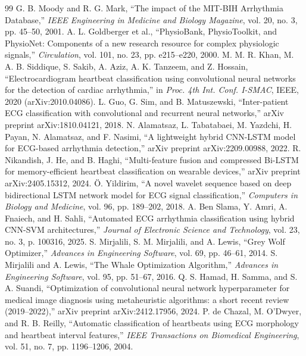 \documentclass[11pt,a4paper]{article}
\begin{document}
\begin{thebibliography}{99}
 G. B. Moody and R. G. Mark, ``The impact of the MIT-BIH Arrhythmia Database,'' \textit{IEEE Engineering in Medicine and Biology Magazine}, vol. 20, no. 3, pp. 45--50, 2001.
 A. L. Goldberger et al., ``PhysioBank, PhysioToolkit, and PhysioNet: Components of a new research resource for complex physiologic signals,'' \textit{Circulation}, vol. 101, no. 23, pp. e215--e220, 2000.
 M. M. R. Khan, M. A. B. Siddique, S. Sakib, A. Aziz, A. K. Tanzeem, and Z. Hossain, ``Electrocardiogram heartbeat classification using convolutional neural networks for the detection of cardiac arrhythmia,'' in \textit{Proc. 4th Int. Conf. I-SMAC}, IEEE, 2020 (arXiv:2010.04086).
 L. Guo, G. Sim, and B. Matuszewski, ``Inter-patient ECG classification with convolutional and recurrent neural networks,'' arXiv preprint arXiv:1810.04121, 2018.
 N. Alamatsaz, L. Tabatabaei, M. Yazdchi, H. Payan, N. Alamatsaz, and F. Nasimi, ``A lightweight hybrid CNN-LSTM model for ECG-based arrhythmia detection,'' arXiv preprint arXiv:2209.00988, 2022.
 R. Nikandish, J. He, and B. Haghi, ``Multi-feature fusion and compressed Bi-LSTM for memory-efficient heartbeat classification on wearable devices,'' arXiv preprint arXiv:2405.15312, 2024.
 \"{O}. Yildirim, ``A novel wavelet sequence based on deep bidirectional LSTM network model for ECG signal classification,'' \textit{Computers in Biology and Medicine}, vol. 96, pp. 189--202, 2018.
 A. Ben Slama, Y. Amri, A. Fnaiech, and H. Sahli, ``Automated ECG arrhythmia classification using hybrid CNN-SVM architectures,'' \textit{Journal of Electronic Science and Technology}, vol. 23, no. 3, p. 100316, 2025.
 S. Mirjalili, S. M. Mirjalili, and A. Lewis, ``Grey Wolf Optimizer,'' \textit{Advances in Engineering Software}, vol. 69, pp. 46--61, 2014.
 S. Mirjalili and A. Lewis, ``The Whale Optimization Algorithm,'' \textit{Advances in Engineering Software}, vol. 95, pp. 51--67, 2016.
 Q. S. Hamad, H. Samma, and S. A. Suandi, ``Optimization of convolutional neural network hyperparameter for medical image diagnosis using metaheuristic algorithms: a short recent review (2019--2022),'' arXiv preprint arXiv:2412.17956, 2024.
 P. de Chazal, M. O'Dwyer, and R. B. Reilly, ``Automatic classification of heartbeats using ECG morphology and heartbeat interval features,'' \textit{IEEE Transactions on Biomedical Engineering}, vol. 51, no. 7, pp. 1196--1206, 2004.

\end{thebibliography}
\end{document}
